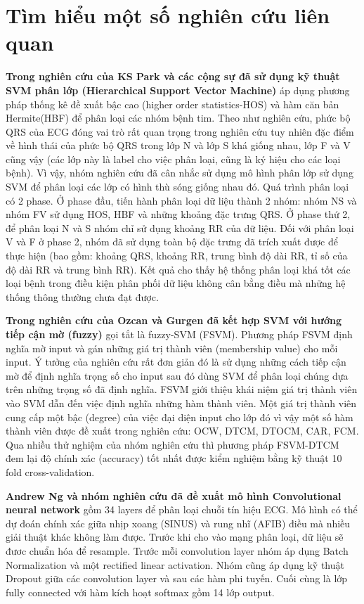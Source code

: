 \section{Tìm hiểu một số nghiên cứu liên quan}
\thispagestyle{fancy}
\textbf{Trong nghiên cứu của KS Park và các cộng sự đã sử dụng kỹ thuật SVM phân lớp (Hierarchical Support Vector Machine)} áp dụng phương pháp thống kê đề xuất bậc cao (higher order statistics-HOS) và hàm căn bản Hermite(HBF) để phân loại các nhóm bệnh tim. Theo như nghiên cứu, phức bộ QRS của ECG đóng vai trò rất quan trọng trong nghiên cứu tuy nhiên đặc điểm về hình thái của phức bộ QRS trong lớp N và lớp S khá giống nhau, lớp F và V cũng vậy (các lớp này là label cho việc phân loại, cũng là ký hiệu cho các loại bệnh). Vì vậy, nhóm nghiên cứu đã cân nhắc sử dụng mô hình phân lớp sử dụng SVM để phân loại các lớp có hình thù sóng giống nhau đó. Quá trình phân loại có 2 phase. Ở phase đầu, tiến hành phân loại dữ liệu thành 2 nhóm: nhóm NS và nhóm FV sử dụng HOS,  HBF và những khoảng đặc trưng QRS. Ở phase thứ 2, để phân loại N và S nhóm chỉ sử dụng khoảng RR của dữ liệu. Đối với phân loại V và F ở phase 2, nhóm đã sử dụng toàn bộ đặc trưng đã trích xuất được để thực hiện (bao gồm: khoảng QRS, khoảng RR, trung bình độ dài RR, tỉ số của độ dài RR và trung bình RR). Kết quả cho thấy hệ thống phân loại khá tốt các loại bệnh trong điều kiện phân phối dữ liệu không cân bằng điều mà những hệ thống thông thường chưa đạt được.

\textbf{Trong nghiên cứu của Ozcan và Gurgen đã kết hợp SVM với hướng tiếp cận mờ (fuzzy)} gọi tắt là fuzzy-SVM (FSVM). Phương pháp FSVM định nghĩa mờ input và gán những giá trị thành viên (membership value) cho mỗi input. Ý tưởng của nghiên cứu rất đơn giản đó là sử dụng những cách tiếp cận mờ để định nghĩa trọng số cho input sau đó dùng SVM để phân loại chúng dựa trên những trọng số đã định nghĩa. FSVM giới thiệu khái niệm giá trị thành viên vào SVM dẫn đến việc định nghĩa những hàm thành viên. Một giá trị thành viên cung cấp một bậc (degree) của việc đại diện input cho lớp đó vì vậy một số hàm thành viên được đề xuất trong nghiên cứu: OCW, DTCM, DTOCM, CAR, FCM. Qua nhiều thử nghiệm của nhóm nghiên cứu thì phương pháp FSVM-DTCM đem lại độ chính xác (accuracy) tốt nhất được kiểm nghiệm bằng kỹ thuật 10 fold cross-validation.

\textbf{Andrew Ng và nhóm nghiên cứu đã đề xuất mô hình Convolutional neural network} gồm 34 layers để phân loại chuỗi tín hiệu ECG. Mô hình có thể dự đoán chính xác giữa nhịp xoang (SINUS) và rung nhĩ (AFIB) điều mà nhiều giải thuật khác không làm được. Trước khi cho vào mạng phân loại, dữ liệu sẽ đươc chuẩn hóa để resample. Trước mỗi convolution layer nhóm áp dụng Batch Normalization và một rectified linear activation. Nhóm cũng áp dụng kỹ thuật Dropout giữa các convolution layer và sau các hàm phi tuyến. Cuối cùng là lớp fully connected với hàm kích hoạt softmax gồm 14 lớp output.

